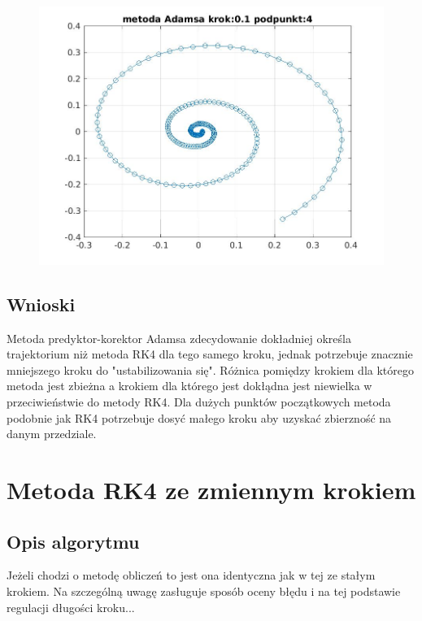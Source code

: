 \documentclass[a4paper, 11pt]{article}
\begin{document}
\begin{figure}[htp]
\centering
\includegraphics[width = 15cm]{2d/metoda Adamsa krok:0,1 podpunkt:4.jpg}
\end{figure}

\subsection{Wnioski}
Metoda predyktor-korektor Adamsa zdecydowanie dokładniej określa trajektorium niż metoda RK4 dla tego samego kroku, jednak potrzebuje znacznie mniejszego kroku do "ustabilizowania się". Różnica pomiędzy krokiem dla którego metoda jest zbieżna a krokiem dla którego jest dokłądna jest niewielka w przeciwieństwie do metody RK4. Dla dużych punktów początkowych metoda podobnie jak RK4 potrzebuje dosyć małego kroku aby uzyskać zbierzność na danym przedziale. 

\section{Metoda RK4 ze zmiennym krokiem}
\subsection{Opis algorytmu}
Jeżeli chodzi o metodę obliczeń to jest ona identyczna jak w tej ze stałym krokiem. Na szczególną uwagę zasługuje sposób oceny błędu i na tej podstawie regulacji długości kroku...
\end{document}
